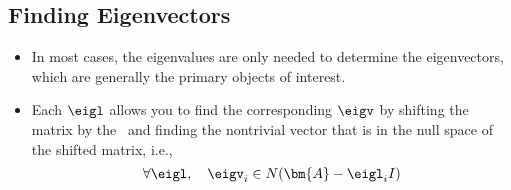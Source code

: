 \begin{itemize}
  \subsection{Finding Eigenvectors}\label{Eigenvectors}
  \begin{itemize}
   \item In most cases, the eigenvalues are only needed to determine the eigenvectors, which are generally the primary objects of interest.
   \item Each \(\eigl\) allows you to find the corresponding \(\eigv\) by shifting the matrix by the \eigl~and finding the nontrivial vector that is in the null space of the shifted matrix, i.e.,
   \[%
   \forall \eigl, \quad \eigv_i \in N(\bm{A}-\eigl_i I)
   \]%
  \end{itemize}

\end{itemize}


